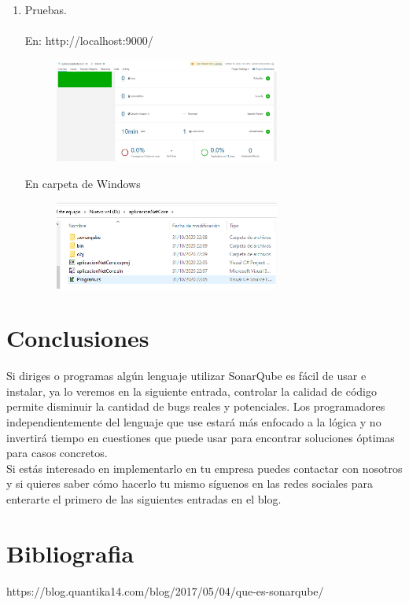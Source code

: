 \documentclass{report}
\begin{document}
\begin{enumerate}
		\item {\large Pruebas.}\\\\
		En:  http://localhost:9000/ \\
		
		\begin{figure}[htb]
			\centering
			\includegraphics[width=0.7\textwidth]{img/web.png}
			\label{fig:web}
		\end{figure}
		
		En carpeta de Windows  \\
		
		\begin{figure}[htb]
			\centering
			\includegraphics[width=0.7\textwidth]{img/escritorio.png}
			\label{fig:escritorio}
		\end{figure}
	\end{enumerate}
	
	\chapter{Conclusiones}
	
	Si diriges o programas algún lenguaje utilizar SonarQube es fácil de usar e instalar, ya lo veremos en la siguiente entrada, controlar la calidad de código permite disminuir la cantidad de bugs reales y potenciales. Los programadores independientemente del lenguaje que use estará más enfocado a la lógica y no invertirá tiempo en cuestiones que puede usar para encontrar soluciones óptimas para casos concretos.\\
	
	Si estás interesado en implementarlo en tu empresa puedes contactar con nosotros y si quieres saber cómo hacerlo tu mismo síguenos en las redes sociales para enterarte el primero de las siguientes entradas en el blog.\\
	
	\chapter{Bibliografia}
	
	https://blog.quantika14.com/blog/2017/05/04/que-es-sonarqube/ \printbibliography
\end{document}
